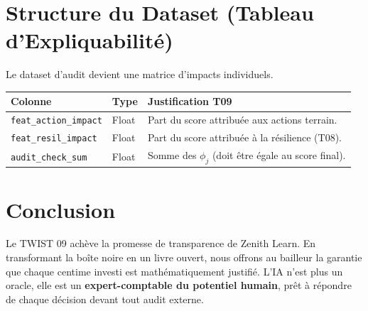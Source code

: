 \documentclass[11pt,a4paper]{article}
\begin{document}
\section{Structure du Dataset (Tableau d'Expliquabilité)}
Le dataset d'audit devient une matrice d'impacts individuels.
\begin{table}[h!]
\centering
\begin{tabular}{|l|l|p{7cm}|}
\hline
\rowcolor{BrandDark} \color{white} Colonne & \color{white} Type & \color{white} Justification T09 \\ \hline
\texttt{feat\_action\_impact} & Float & Part du score attribuée aux actions terrain. \\ \hline
\rowcolor{BrandPrimary!20} \texttt{feat\_resil\_impact} & Float & Part du score attribuée à la résilience (T08). \\ \hline
\texttt{audit\_check\_sum} & Float & Somme des $\phi_j$ (doit être égale au score final). \\ \hline
\end{tabular}
\end{table}

\section{Conclusion}
Le TWIST 09 achève la promesse de transparence de Zenith Learn. En transformant la boîte noire en un livre ouvert, nous offrons au bailleur la garantie que chaque centime investi est mathématiquement justifié. L'IA n'est plus un oracle, elle est un \textbf{expert-comptable du potentiel humain}, prêt à répondre de chaque décision devant tout audit externe.
\end{document}
